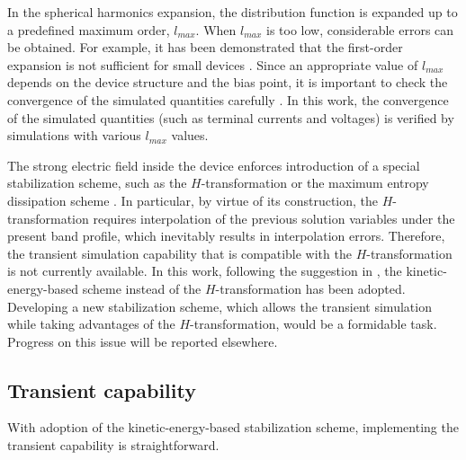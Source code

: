 \documentclass[journal]{IEEEtran}
\newcommand{\revision}[1]{{#1}}
\begin{document}
\revision{In the spherical harmonics expansion,
the distribution function is expanded up to a predefined maximum order, $l_{max}$.
   When $l_{max}$ is too low, considerable errors can be obtained.
   For example, it has been demonstrated that the first-order expansion is not sufficient for small devices \cite{Rahmat1996,Jungemann2006}.
   Since an appropriate value of $l_{max}$ depends on the device structure and the bias point, it is important to check the convergence of the simulated quantities carefully \cite{Fischetti2016}. 
   In this work, the convergence of the simulated quantities (such as terminal currents and voltages) is verified by simulations with various $l_{max}$ values.}
      
   The strong electric field inside the device enforces introduction of a special stabilization scheme, such as the $H$-transformation \cite{Gnudi1993} or the maximum entropy dissipation scheme \cite{Ringhofer2002,Jungemann2006}.
   In particular, by virtue of its construction, the $H$-transformation requires interpolation of the previous solution variables under the present band profile, which inevitably results in interpolation errors.
   Therefore, the transient simulation capability that is compatible with the $H$-transformation is not currently available.  
   In this work, following the suggestion in \cite{Rupp2016}, the kinetic-energy-based scheme \cite{Jungemann2006} instead of the $H$-transformation has been adopted.
\revision{Developing a new stabilization scheme, which allows the transient simulation while taking advantages of the $H$-transformation, would be a formidable task.
   Progress on this issue will be reported elsewhere.}   
 

\subsection{Transient capability}

   With adoption of the kinetic-energy-based stabilization scheme, implementing the transient capability is straightforward. 
\end{document}
